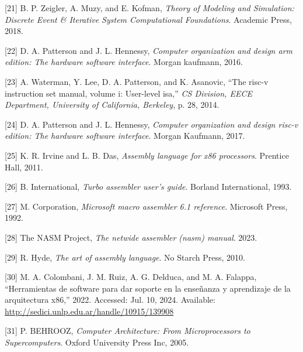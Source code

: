 \documentclass[12pt,twoside]{templates/unerthesis}
\begin{document}
\leavevmode\hypertarget{ref-zeigler_theory_2018}{}%
{[}21{]} B. P. Zeigler, A. Muzy, and E. Kofman, \emph{Theory of Modeling and Simulation: Discrete Event \& Iterative System Computational Foundations}. Academic Press, 2018.

\leavevmode\hypertarget{ref-patterson2016computer}{}%
{[}22{]} D. A. Patterson and J. L. Hennessy, \emph{Computer organization and design arm edition: The hardware software interface}. Morgan kaufmann, 2016.

\leavevmode\hypertarget{ref-waterman2014risc}{}%
{[}23{]} A. Waterman, Y. Lee, D. A. Patterson, and K. Asanovic, ``The risc-v instruction set manual, volume i: User-level isa,'' \emph{CS Division, EECE Department, University of California, Berkeley}, p. 28, 2014.

\leavevmode\hypertarget{ref-patterson_computer_2017}{}%
{[}24{]} D. A. Patterson and J. L. Hennessy, \emph{Computer organization and design risc-v edition: The hardware software interface}. Morgan Kaufmann, 2017.

\leavevmode\hypertarget{ref-irvine2011assembly}{}%
{[}25{]} K. R. Irvine and L. B. Das, \emph{Assembly language for x86 processors}. Prentice Hall, 2011.

\leavevmode\hypertarget{ref-tasm}{}%
{[}26{]} B. International, \emph{Turbo assembler user's guide}. Borland International, 1993.

\leavevmode\hypertarget{ref-masm}{}%
{[}27{]} M. Corporation, \emph{Microsoft macro assembler 6.1 reference}. Microsoft Press, 1992.

\leavevmode\hypertarget{ref-nasm}{}%
{[}28{]} The NASM Project, \emph{The netwide assembler (nasm) manual}. 2023.

\leavevmode\hypertarget{ref-hyde2010art}{}%
{[}29{]} R. Hyde, \emph{The art of assembly language}. No Starch Press, 2010.

\leavevmode\hypertarget{ref-colombani_herramientas_2022}{}%
{[}30{]} M. A. Colombani, J. M. Ruiz, A. G. Delduca, and M. A. Falappa, ``Herramientas de software para dar soporte en la enseñanza y aprendizaje de la arquitectura x86,'' 2022. Accessed: Jul. 10, 2024. Available: \url{http://sedici.unlp.edu.ar/handle/10915/139908}

\leavevmode\hypertarget{ref-behrooz_computer_2005}{}%
{[}31{]} P. BEHROOZ, \emph{Computer Architecture: From Microprocessors to Supercomputers}. Oxford University Press Inc, 2005.




\end{document}
